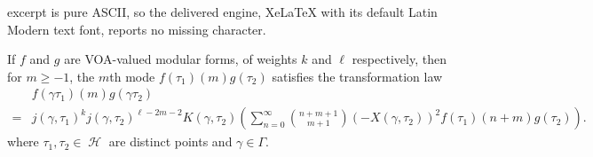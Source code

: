 \documentclass[10pt,a4paper]{amsart}
\DeclareMathOperator{\uhp}{\mathcal{H}}
\begin{document}
excerpt is pure ASCII, so the delivered engine, XeLaTeX with its default Latin Modern text font, reports no missing character.
\begin{prop}
\label{p:positivemodes}
    If $f$ and $g$ are VOA-valued modular forms, of weights $k$ and $\ell$ respectively, then for $m\geq -1$, the $m$th mode $f(\tau_1)(m)g(\tau_2)$ satisfies the transformation law
 \begin{align}
        \label{eq:prodtran}
        &f(\gamma\tau_1)(m)g(\gamma\tau_2)\\
        \nonumber =&j(\gamma,\tau_1)^kj(\gamma,\tau_2)^{\ell-2m-2}K(\gamma,\tau_2)\left(\sum_{n=0}^{\infty}\binom{n+m+1}{m+1}(-X(\gamma, \tau_2))^2f(\tau_1)(n+m)g(\tau_2)\right).
    \end{align}
    where $\tau_1,\tau_2 \in \uhp$ are distinct points and $\gamma \in \Gamma$.
\end{prop}
\end{document}
